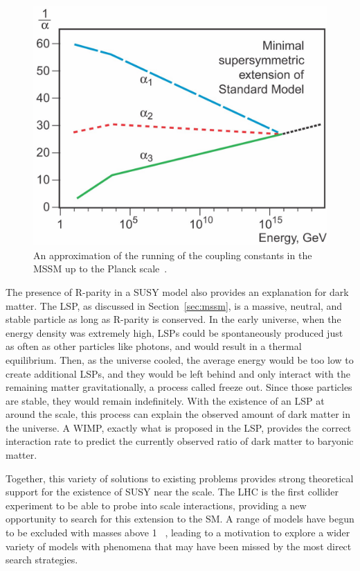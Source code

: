 \begin{figure}
\includegraphics[width=\fullfig]{figures/unification_susy.jpg}
\caption{An approximation of the running of the coupling constants in the \ac{MSSM} up to the Planck scale~\cite{unification_plot}.}
\label{fig:unification_susy}
\end{figure}

The presence of R-parity in a \ac{SUSY} model also provides an explanation for dark matter.
The \ac{LSP}, as discussed in Section~\ref{sec:mssm}, is a massive, neutral, and stable particle as long as R-parity is conserved.
In the early universe, when the energy density was extremely high, \acp{LSP} could be spontaneously produced just as often as other particles like photons, and would result in a thermal equilibrium.
Then, as the universe cooled, the average energy would be too low to create additional \acp{LSP}, and they would be left behind and only interact with the remaining matter gravitationally, a process called freeze out.
Since those particles are stable, they would remain indefinitely. 
With the existence of an \ac{LSP} at around the \TeV scale, this process can explain the observed amount of dark matter in the universe.
A \ac{WIMP}, exactly what is proposed in the \ac{LSP}, provides the correct interaction rate to predict the currently observed ratio of dark matter to baryonic matter.

Together, this variety of solutions to existing problems provides strong theoretical support for the existence of \ac{SUSY} near the \TeV scale.
The \ac{LHC} is the first collider experiment to be able to probe into \TeV scale interactions, providing a new opportunity to search for this extension to the \ac{SM}.
A range of models have begun to be excluded with masses above 1 \TeV~\cite{pdg}, leading to a motivation to explore a wider variety of models with phenomena that may have been missed by the most direct search strategies.

